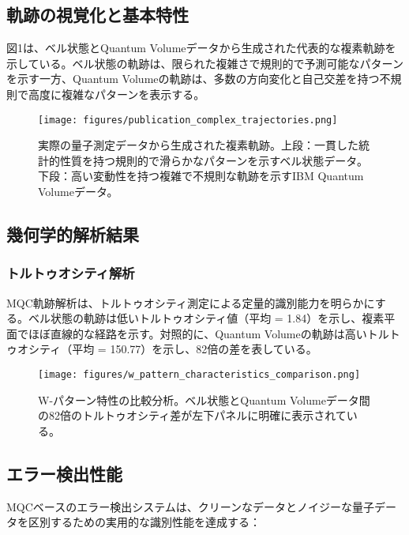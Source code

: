 \documentclass[a4paper,11pt]{article}
\begin{document}
\begin{CJK}{UTF8}{min}
\subsection{軌跡の視覚化と基本特性}

図1は、ベル状態とQuantum Volumeデータから生成された代表的な複素軌跡を示している。ベル状態の軌跡は、限られた複雑さで規則的で予測可能なパターンを示す一方、Quantum Volumeの軌跡は、多数の方向変化と自己交差を持つ不規則で高度に複雑なパターンを表示する。

\begin{figure}[H]
\centering
\texttt{[image: figures/publication\_complex\_trajectories.png]}
\caption{実際の量子測定データから生成された複素軌跡。上段：一貫した統計的性質を持つ規則的で滑らかなパターンを示すベル状態データ。下段：高い変動性を持つ複雑で不規則な軌跡を示すIBM Quantum Volumeデータ。}
\label{fig:trajectories}
\end{figure}

\subsection{幾何学的解析結果}

\subsubsection{トルトゥオシティ解析}
MQC軌跡解析は、トルトゥオシティ測定による定量的識別能力を明らかにする。ベル状態の軌跡は低いトルトゥオシティ値（平均 = 1.84）を示し、複素平面でほぼ直線的な経路を示す。対照的に、Quantum Volumeの軌跡は高いトルトゥオシティ（平均 = 150.77）を示し、82倍の差を表している。

\begin{figure}[H]
\centering
\texttt{[image: figures/w\_pattern\_characteristics\_comparison.png]}
\caption{W-パターン特性の比較分析。ベル状態とQuantum Volumeデータ間の82倍のトルトゥオシティ差が左下パネルに明確に表示されている。}
\label{fig:w_pattern}
\end{figure}

\subsection{エラー検出性能}

MQCベースのエラー検出システムは、クリーンなデータとノイジーな量子データを区別するための実用的な識別性能を達成する：


\end{CJK}
\end{document}
